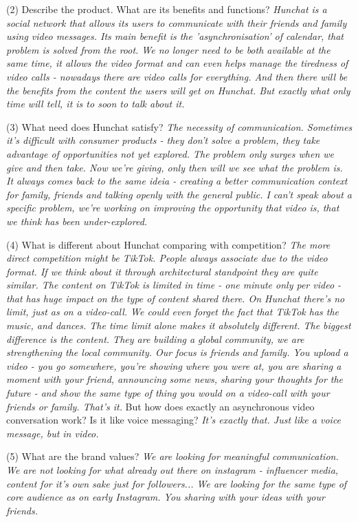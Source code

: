 \documentclass[12pt]{article}
\begin{document}
(2) Describe the product. What are its benefits and functions? \textit{Hunchat is a social network that allows its users to communicate with their friends and family using video messages. Its main benefit is the 'asynchronisation' of calendar, that problem is solved from the root. We no longer need to be both available at the same time, it allows the video format and can even helps manage the tiredness of video calls - nowadays there are video calls for everything. And then there will be the benefits from the content the users will get on Hunchat. But exactly what only time will tell, it is to soon to talk about it.}

(3) What need does Hunchat satisfy? \textit{The necessity of communication. Sometimes it's difficult with consumer products - they don't solve a problem, they take advantage of opportunities not yet explored. The problem only surges when we give and then take. Now we're giving, only then will we see what the problem is. It always comes back to the same ideia - creating a better communication context for family, friends and talking openly with the general public. I can't speak about a specific problem, we're working on improving the opportunity that video is, that we think has been under-explored.}

(4) What is different about Hunchat comparing with competition? \textit{The more direct competition might be TikTok. People always associate due to the video format. If we think about it through architectural standpoint they are quite similar. The content on TikTok is limited in time - one minute only per video - that has huge impact on the type of content shared there. On Hunchat there's no limit, just as on a video-call. We could even forget the fact that TikTok has the music, and dances. The time limit alone makes it absolutely different. The biggest difference is the content. They are building a global community, we are strengthening the local community. Our focus is friends and family. You upload a video - you go somewhere, you're showing where you were at,  you are sharing a moment with your friend, announcing some news, sharing your thoughts for the future - and show the same type of thing you would on a video-call with your friends or family. That's it.} But how does exactly an asynchronous video conversation work? Is it like voice messaging? \textit{It's exactly that. Just like a voice message, but in video.}

(5) What are the brand values? \textit{We are looking for meaningful communication. We are not looking for what already out there on instagram - influencer media, content for it's own sake just for followers... We are looking for the same type of core audience as on early Instagram. You sharing with your ideas with your friends.}
\end{document}

